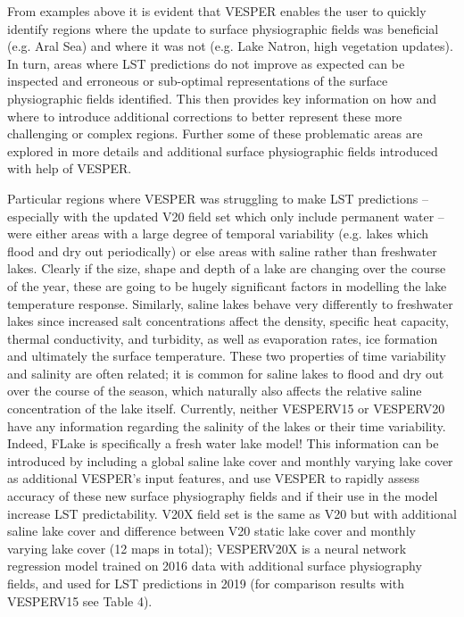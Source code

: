 \documentclass[hess, twostagejnl]{copernicus}
\begin{document}
From  examples  above  it  is  evident  that  VESPER  enables  the  user  to  quickly  identify  regions  where  the  update  to  surface physiographic fields was beneficial (e.g. Aral Sea) and where it was not (e.g. Lake Natron, high vegetation updates). In turn, areas where LST predictions do not improve as expected can be inspected and erroneous or sub-optimal representations of the surface  physiographic  fields  identified.  This  then  provides  key  information  on  how  and  where  to  introduce  additional corrections to better represent these more challenging or complex regions. Further some of these problematic areas are explored in more details and additional surface physiographic fields introduced with help of VESPER.



Particular regions where VESPER was struggling to make LST predictions – especially with the updated V20 field set which only include permanent water – were either areas with a large degree of temporal variability (e.g. lakes which flood and dry out periodically) or else areas with saline rather than freshwater lakes. Clearly if the size, shape and depth of a lake are changing over the course of the year, these are going to be hugely significant factors in modelling the lake temperature response. Similarly, saline lakes behave very differently to freshwater lakes since increased salt concentrations affect the density, specific heat capacity, thermal conductivity, and turbidity, as well as evaporation rates, ice formation and ultimately the surface temperature. These two properties of time variability and salinity are often related; it is common for saline lakes to flood and dry out over the course of the season, which naturally also affects the relative saline concentration of the lake itself.
Currently, neither VESPERV15 or VESPERV20 have any information regarding the salinity of the lakes or their time variability. Indeed, FLake is specifically a fresh water lake model! This information can be introduced by including a global saline lake cover and monthly varying lake cover as additional VESPER’s input features, and use VESPER to rapidly assess accuracy of these new surface physiography fields and if their use in the model increase LST predictability. V20X field set is the same as V20 but with additional saline lake cover and difference between V20 static lake cover and monthly varying lake cover (12 maps in total); VESPERV20X is a neural network regression model trained on 2016 data with additional surface physiography fields, and used for LST predictions in 2019 (for comparison results with VESPERV15 see Table 4).
\end{document}
